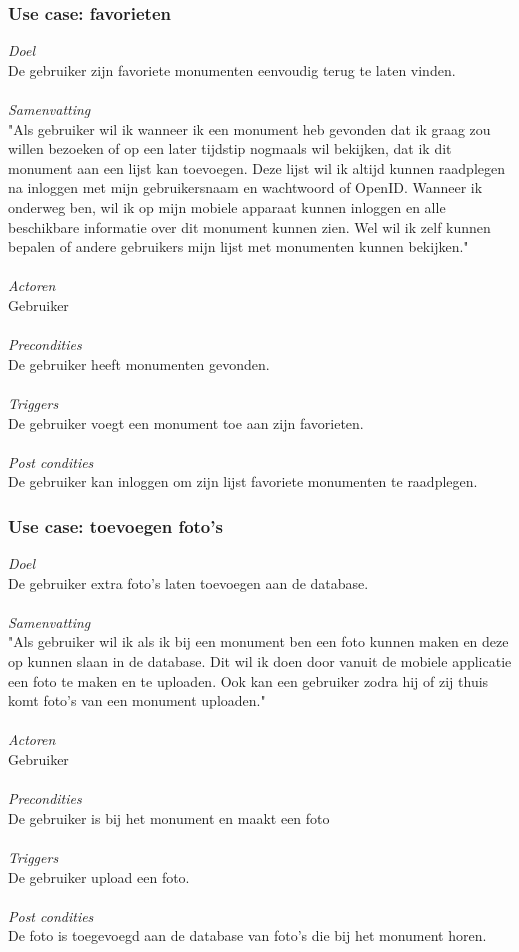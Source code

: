 \documentclass[a4paper,10pt]{article}
\begin{document}
			\subsubsection{Use case: favorieten}
			\textit{Doel}\\
			De gebruiker zijn favoriete monumenten eenvoudig terug te laten vinden.\\ \\
			\textit{Samenvatting}\\
			"Als gebruiker wil ik wanneer ik een monument heb gevonden dat ik graag zou willen bezoeken of op een later tijdstip nogmaals wil bekijken, dat ik dit monument aan een lijst kan toevoegen. Deze lijst wil ik altijd kunnen raadplegen na inloggen met mijn gebruikersnaam en wachtwoord of OpenID. Wanneer ik onderweg ben, wil ik op mijn mobiele apparaat kunnen inloggen en alle beschikbare informatie over dit monument kunnen zien. Wel wil ik zelf kunnen bepalen of andere gebruikers mijn lijst met monumenten kunnen bekijken."\\ \\
			\textit{Actoren}\\
			Gebruiker\\ \\
			\textit{Precondities}\\
			De gebruiker heeft monumenten gevonden.\\ \\
			\textit{Triggers}\\
			De gebruiker voegt een monument toe aan zijn favorieten.\\ \\
			\textit{Post condities}\\
			De gebruiker kan inloggen om zijn lijst favoriete monumenten te raadplegen.	
			
			\subsubsection{Use case: toevoegen foto's}
			\textit{Doel}\\
			De gebruiker extra foto's laten toevoegen aan de database.\\ \\
			\textit{Samenvatting}\\
			"Als gebruiker wil ik als ik bij een monument ben een foto kunnen maken en deze op kunnen slaan in de database. Dit wil ik doen door vanuit de mobiele applicatie een foto te maken en te uploaden. Ook kan een gebruiker zodra hij of zij thuis komt foto's van een monument uploaden."\\ \\
			\textit{Actoren}\\
			Gebruiker\\ \\
			\textit{Precondities}\\
			De gebruiker is bij het monument en maakt een foto\\ \\
			\textit{Triggers}\\
			De gebruiker upload een foto.\\ \\
			\textit{Post condities}\\
			De foto is toegevoegd aan de database van foto's die bij het monument horen.
\end{document}
